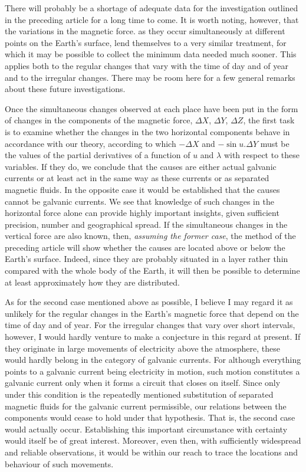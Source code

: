 There will probably be a shortage of adequate data for the investigation outlined in the preceding article for a long time to come. It is worth noting, however, that the variations in the magnetic force. as they occur simultaneously at different points on the Earth's surface, lend themselves to a very similar treatment, for which it may be possible to collect the minimum data needed much sooner. This applies both to the regular changes that vary with the time of day and of year and to the irregular changes. There may be room here for a few general remarks about these future investigations.

Once the simultaneous changes observed at each place have been put in the form of changes in the components of the magnetic force, $\Delta X$, $\Delta Y$, $\Delta Z$, the first task is to examine whether the changes in the two horizontal components behave in accordance with our theory, according to which $-\Delta X$ and $-\sin u.\Delta Y$ must be the values of the partial derivatives of a function of $u$ and $\lambda$ with respect to these variables. If they do, we conclude that the causes are either actual galvanic currents or at least act in the same way as these currents or as separated magnetic fluids. In the opposite case it would be established that the causes cannot be galvanic currents. We see that knowledge of such changes in the horizontal force alone can provide highly important insights, given sufficient precision, number and geographical spread. If the simultaneous changes in the vertical force are also known, then, \textit{assuming the former case}, the method of the preceding article will show whether the causes are located above or below the Earth's surface. Indeed, since they are probably situated in a layer rather thin compared with the whole body of the Earth, it will then be possible to determine at least approximately how they are distributed.

As for the second case mentioned above as possible, I believe I may regard it as unlikely for the regular changes in the Earth's magnetic force that depend on the time of day and of year. For the irregular changes that vary over short intervals, however, I would hardly venture to make a conjecture
in this regard at present. If they originate in large movements of electricity above the atmosphere, these would hardly belong in the category of galvanic currents. For although everything points to a galvanic current being electricity in motion, such motion constitutes a galvanic current only when it forms a circuit that closes on itself. Since only under this condition is the repeatedly mentioned substitution of separated magnetic fluids for the galvanic current permissible, our relations between the components would cease to hold under that hypothesis. That is, the second case would actually occur. Establishing this important circumstance with certainty would itself be of great interest. Moreover, even then, with sufficiently widespread and reliable observations, it would be within our reach to trace the locations and behaviour of such movements.
